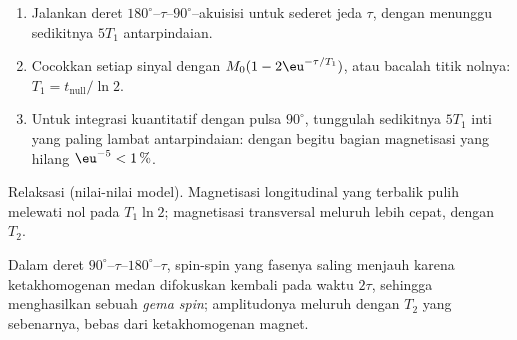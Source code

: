 \begin{method}\label{met:b3:advanced-nmr:t1}
\begin{enumerate}
  \item Jalankan deret $180^\circ$--$\tau$--$90^\circ$--akuisisi untuk sederet jeda
        $\tau$, dengan menunggu sedikitnya $5T_1$ antarpindaian.
  \item Cocokkan setiap sinyal dengan $M_0(1 - 2\eu^{-\tau/T_1})$, atau bacalah
        titik nolnya: $T_1 =
        t_{\mathrm{null}}/\ln2$.
  \item Untuk integrasi kuantitatif dengan pulsa $90^\circ$, tunggulah
        sedikitnya $5T_1$ inti yang paling lambat antarpindaian: dengan begitu
        bagian magnetisasi yang hilang $\eu^{-5} < 1\,\%$.
\end{enumerate}
\end{method}

\begin{omfigure}

{\small Relaksasi (nilai-nilai model). Magnetisasi longitudinal yang
terbalik pulih melewati nol pada $T_1\ln2$; magnetisasi transversal meluruh
lebih cepat, dengan $T_2$.}
\end{omfigure}

\begin{definition}\label{def:b3:advanced-nmr:echo}
Dalam deret $90^\circ$--$\tau$--$180^\circ$--$\tau$, spin-spin yang fasenya saling
menjauh karena ketakhomogenan medan difokuskan kembali pada waktu $2\tau$,
sehingga menghasilkan sebuah \emph{gema spin}; amplitudonya
meluruh dengan $T_2$ yang sebenarnya, bebas dari ketakhomogenan magnet.
\end{definition}

